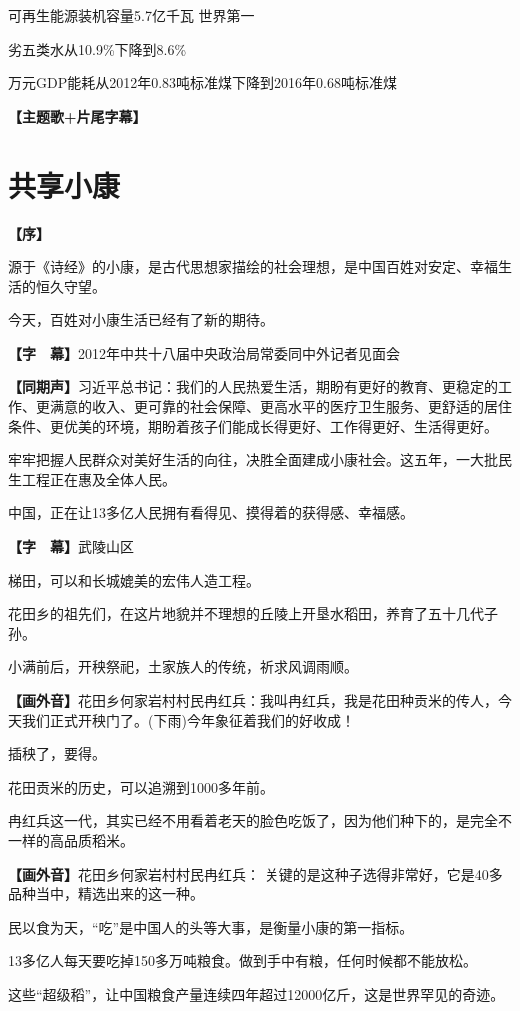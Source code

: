 \documentclass{ctexart}
\newcommand{\zkh}[1]{\textbf{\hspace{-2.7em} 【#1】}}
\begin{document}
 可再生能源装机容量5.7亿千瓦 世界第一

 劣五类水从10.9{\%}下降到8.6{\%}

万元GDP能耗从2012年0.83吨标准煤下降到2016年0.68吨标准煤

\zkh{主题歌+片尾字幕}

\newpage\part{共享小康}

\zkh{序} 

源于《诗经》的小康，是古代思想家描绘的社会理想，是中国百姓对安定、幸福生活的恒久守望。

 今天，百姓对小康生活已经有了新的期待。

 \zkh{字　幕}2012年中共十八届中央政治局常委同中外记者见面会

 \zkh{同期声}习近平总书记：我们的人民热爱生活，期盼有更好的教育、更稳定的工作、更满意的收入、更可靠的社会保障、更高水平的医疗卫生服务、更舒适的居住条件、更优美的环境，期盼着孩子们能成长得更好、工作得更好、生活得更好。

 
牢牢把握人民群众对美好生活的向往，决胜全面建成小康社会。这五年，一大批民生工程正在惠及全体人民。

 中国，正在让13多亿人民拥有看得见、摸得着的获得感、幸福感。

\zkh{字　幕}武陵山区

 梯田，可以和长城媲美的宏伟人造工程。

 花田乡的祖先们，在这片地貌并不理想的丘陵上开垦水稻田，养育了五十几代子孙。

 小满前后，开秧祭祀，土家族人的传统，祈求风调雨顺。

 \zkh{画外音}花田乡何家岩村村民冉红兵：我叫冉红兵，我是花田种贡米的传人，今天我们正式开秧门了。(下雨)今年象征着我们的好收成！

 插秧了，要得。

 花田贡米的历史，可以追溯到1000多年前。

冉红兵这一代，其实已经不用看着老天的脸色吃饭了，因为他们种下的，是完全不一样的高品质稻米。

 \zkh{画外音}花田乡何家岩村村民冉红兵： 关键的是这种子选得非常好，它是40多品种当中，精选出来的这一种。

 民以食为天，``吃''是中国人的头等大事，是衡量小康的第一指标。

 13多亿人每天要吃掉150多万吨粮食。做到手中有粮，任何时候都不能放松。

 这些``超级稻''，让中国粮食产量连续四年超过12000亿斤，这是世界罕见的奇迹。
\end{document}
